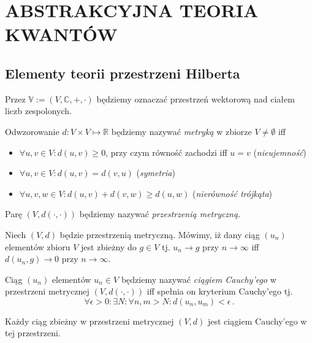 \documentclass{myclass}
\author{Bartosz Hanc}
\begin{document}
\section{ABSTRAKCYJNA TEORIA KWANTÓW}

\subsection{Elementy teorii przestrzeni Hilberta}

Przez \(\mathbb{V} := (V,\mathbb{C},+,\cdot)\) będziemy oznaczać przestrzeń wektorową nad ciałem
liczb zespolonych.

\begin{definition}
Odwzorowanie \(d: V \times V \mapsto \mathbb{R}\) będziemy nazywać \textit{metryką} w zbiorze \(V
\neq \emptyset\) iff
\begin{itemize}

\item \(\forall u,v \in V : d(u,v) \geq 0\), przy czym równość zachodzi iff \(u = v\)
(\textit{nieujemność})

\item \(\forall u,v \in V : d(u,v) = d(v,u)\) (\textit{symetria})

\item \(\forall u,v,w \in V : d(u,v) + d(v,w) \geq d(u,w)\) (\textit{nierówność trójkąta})

\end{itemize}
Parę \((V,d(\cdot,\cdot))\) będziemy nazywać \textit{przestrzenią metryczną}.
\end{definition}

\begin{definition}
Niech \((V,d)\) będzie przestrzenią metryczną. Mówimy, iż dany ciąg \((u_n)\) elementów zbioru \(V\)
jest zbieżny do \(g\in V\) tj. \(u_n \to g\) przy \(n \to \infty\) iff \(d(u_n,g) \to 0\) przy \(n
\to \infty\).   
\end{definition}

\begin{definition}
Ciąg \((u_n)\) elementów \(u_n \in V\) będziemy nazywać \textit{ciągiem Cauchy'ego} w przestrzeni
metrycznej \((V,d(\cdot,\cdot))\) iff spełnia on kryterium Cauchy'ego tj.
\begin{equation*}
    \forall \epsilon > 0 : \exists N : \forall n,m > N : d(u_n,u_m) < \epsilon\,.
\end{equation*}  
\end{definition}

\begin{theorem}
Każdy ciąg zbieżny w przestrzeni metrycznej \((V,d)\) jest ciągiem Cauchy'ego w tej przestrzeni.
\end{theorem}
\end{document}
